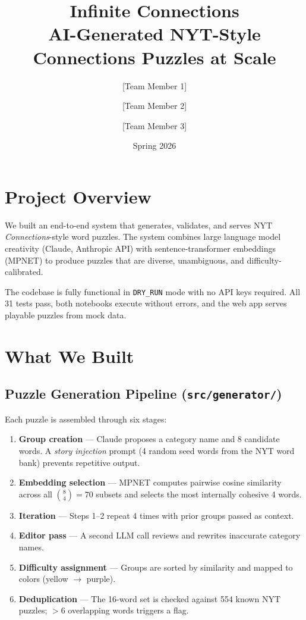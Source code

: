 \documentclass[11pt]{article}
\title{\textbf{Infinite Connections}\\[4pt]
\large AI-Generated NYT-Style Connections Puzzles at Scale}
\author{[Team Member 1] \and [Team Member 2] \and [Team Member 3]}
\date{Spring 2026}
\begin{document}
\maketitle

\section{Project Overview}

We built an end-to-end system that generates, validates, and serves
NYT \emph{Connections}-style word puzzles. The system combines large language
model creativity (Claude, Anthropic API) with sentence-transformer embeddings
(MPNET) to produce puzzles that are diverse, unambiguous, and difficulty-calibrated.

The codebase is fully functional in \texttt{DRY\_RUN} mode with no API keys
required. All 31 tests pass, both notebooks execute without errors, and the
web app serves playable puzzles from mock data.

\section{What We Built}

\subsection{Puzzle Generation Pipeline (\texttt{src/generator/})}

Each puzzle is assembled through six stages:

\begin{enumerate}[nosep]
    \item \textbf{Group creation} --- Claude proposes a category name and 8
          candidate words. A \emph{story injection} prompt (4 random seed words
          from the NYT word bank) prevents repetitive output.
    \item \textbf{Embedding selection} --- MPNET computes pairwise cosine
          similarity across all $\binom{8}{4} = 70$ subsets and selects the
          most internally cohesive 4 words.
    \item \textbf{Iteration} --- Steps 1--2 repeat 4 times with prior groups
          passed as context.
    \item \textbf{Editor pass} --- A second LLM call reviews and rewrites
          inaccurate category names.
    \item \textbf{Difficulty assignment} --- Groups are sorted by similarity
          and mapped to colors (yellow $\to$ purple).
    \item \textbf{Deduplication} --- The 16-word set is checked against 554
          known NYT puzzles; $>$6 overlapping words triggers a flag.
\end{enumerate}
\end{document}
